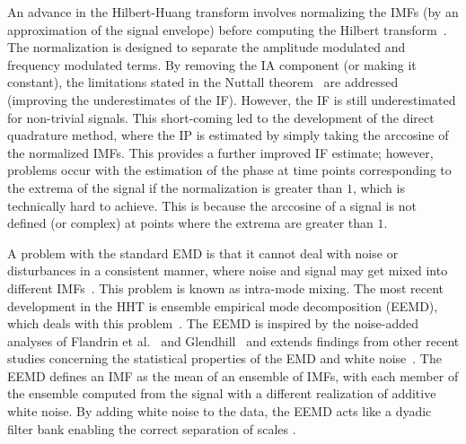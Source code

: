 \documentclass[a4paper]{IEEEtran}
\begin{document}
An advance in the Hilbert-Huang transform involves normalizing the IMFs (by an approximation of the signal envelope) before computing the Hilbert transform~\cite{Huang2005}. The normalization is designed to separate the amplitude modulated and frequency modulated terms. By removing the IA component (or making it constant), the limitations stated in the Nuttall theorem~\cite{Nuttall1966} are addressed (improving the underestimates of the IF). However, the IF is still underestimated for non-trivial signals. This short-coming led to the development of the direct quadrature method, where the IP is estimated by simply taking the arccosine of the normalized IMFs. This provides a further improved IF estimate; however, problems occur with the estimation of the phase at time points corresponding to the extrema of the signal if the normalization is greater than $1$, which is technically hard to achieve. This is because the arccosine of a signal is not defined (or complex) at points where the extrema are greater than $1$. 

A problem with the standard EMD is that it cannot deal with noise or disturbances in a consistent manner, where noise and signal may get mixed into different IMFs~\cite{Wu2009}. This problem is known as intra-mode mixing. The most recent development in the HHT is ensemble empirical mode decomposition (EEMD), which deals with this problem~\cite{Wu2009}. The EEMD is inspired by the noise-added analyses of Flandrin et al.~\cite{Flandrin2005} and Glendhill~\cite{Gledhill2003} and extends findings from other recent studies concerning the statistical properties of the EMD and white noise~\cite{Flandrin2004,Wu2004}. The EEMD defines an IMF as the mean of an ensemble of IMFs, with each member of the ensemble computed from the signal with a different realization of additive white noise. By adding white noise to the data, the EEMD acts like a dyadic filter bank enabling the correct separation of scales \cite{Flandrin2005a}.
\end{document}

